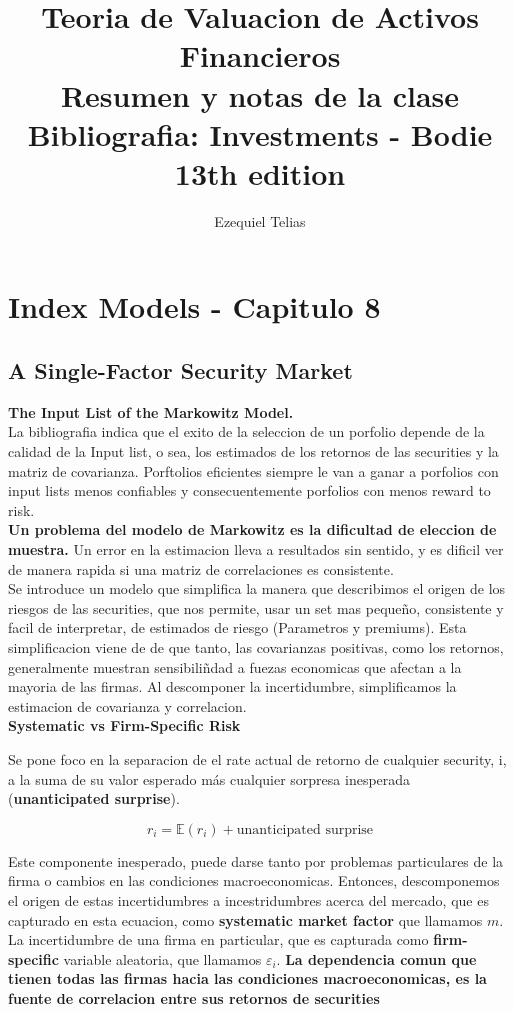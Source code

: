 \documentclass{article}
\title{
    \textbf{Teoria de Valuacion de Activos Financieros} \\ 
    Resumen y notas de la clase
    \\
    \small Bibliografia: Investments - Bodie 13th edition
}
\author{Ezequiel Telias}
\date{}
\begin{document}
\maketitle

\section{Index Models - Capitulo 8}
\subsection{A Single-Factor Security Market}
\textbf{The Input List of the Markowitz Model.}\\

La bibliografia indica que el exito de la seleccion de un porfolio depende de la calidad de la Input list, 
o sea, los estimados de los retornos de las securities y la matriz de covarianza. 
Porftolios eficientes siempre le van a ganar a porfolios con input lists menos confiables y consecuentemente 
porfolios con menos reward to risk.
\\

\textbf{Un problema del modelo de Markowitz es la dificultad de eleccion de muestra.}
Un error en la estimacion lleva a resultados sin sentido, y es dificil ver de manera rapida si una matriz de correlaciones es consistente.
\\

Se introduce un modelo que simplifica la manera que describimos el origen de los riesgos de las securities, que nos permite, 
usar un set mas pequeño, consistente y facil de interpretar, de estimados de riesgo (Parametros y premiums). Esta simplificacion viene 
de de que tanto, las covarianzas positivas, como los retornos, generalmente muestran sensibiliñdad a fuezas economicas que afectan a la
mayoria de las firmas. Al descomponer la incertidumbre,  simplificamos la estimacion de covarianza y correlacion.
\\

\textbf{Systematic vs Firm-Specific Risk}

Se pone foco en la separacion de el rate actual de retorno de cualquier security, i, a la suma de su valor esperado 
más cualquier sorpresa inesperada (\textbf{unanticipated surprise}).

\[
r_i = \mathbb{E}(r_i) + \text{unanticipated surprise}
\]

Este componente inesperado, puede darse tanto por problemas particulares de la firma o cambios en las condiciones macroeconomicas. 
Entonces, descomponemos el origen de estas incertidumbres a incestridumbres acerca del mercado, que es capturado en esta ecuacion,
como \textbf{systematic market factor} que llamamos \textbf{$m$}. La incertidumbre de una firma en particular, que es capturada como 
\textbf{firm-specific} variable aleatoria, que llamamos \textbf{$\varepsilon_i$}. \textbf{La dependencia comun que tienen todas las
 firmas hacia las condiciones macroeconomicas, es la fuente de correlacion entre sus retornos de securities} 
\end{document}
